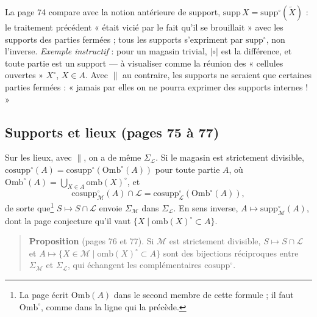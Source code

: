 \documentclass[11pt,a4paper]{article}
\begin{document}
La page 74 compare avec la notion antérieure de support, $\mathrm{supp}\,X =
\mathrm{supp}^{\circ}(\widetilde{X})$ : le traitement précédent « était vicié
par le fait qu'il se brouillait » avec les supports des parties fermées ; tous
les supports s'expriment par $\mathrm{supp}^{\circ}$, non l'inverse.
\emph{Exemple instructif} : pour un magasin trivial, $\mathrel{|\circ|}$ est la
différence, et toute partie est un support --- à visualiser comme la réunion
des « cellules ouvertes » $X^{\circ}$, $X \in A$. Avec $\parallel$ au contraire,
les supports ne seraient que certaines parties fermées : « jamais par elles on
ne pourra exprimer des supports internes ! »

\subsection*{Supports et lieux (pages 75 à 77)}

Sur les lieux, avec $\parallel$, on a de même $\Sigma_{\mathcal{L}}$. Si le
magasin est strictement divisible, $\mathrm{cosupp}^{\circ}(A) =
\mathrm{cosupp}^{\circ}(\mathrm{Omb}^{\circ}(A))$ pour toute partie $A$, où
$\mathrm{Omb}^{\circ}(A) = \bigcup_{X \in A} \mathrm{omb}(X)^{\circ}$, et
\[
\mathrm{cosupp}^{\circ}_{\mathcal{M}}(A) \cap \mathcal{L} =
\mathrm{cosupp}^{\circ}_{\mathcal{L}}(\mathrm{Omb}^{\circ}(A)),
\]
de sorte que\footnote{La page écrit $\mathrm{Omb}(A)$ dans le second membre de
cette formule ; il faut $\mathrm{Omb}^{\circ}$, comme dans la ligne qui la
précède.} $S \mapsto S \cap \mathcal{L}$ envoie $\Sigma_{\mathcal{M}}$ dans
$\Sigma_{\mathcal{L}}$. En sens inverse, $A \mapsto
\mathrm{supp}^{\circ}_{\mathcal{M}}(A)$, dont la page conjecture qu'il vaut
$\{X \mid \mathrm{omb}(X)^{\circ} \subset A\}$.

\begin{quote}
\textbf{Proposition} (pages 76 et 77). Si $\mathcal{M}$ est strictement
divisible, $S \mapsto S \cap \mathcal{L}$ et $A \mapsto \{X \in \mathcal{M}
\mid \mathrm{omb}(X)^{\circ} \subset A\}$ sont des bijections réciproques entre
$\Sigma_{\mathcal{M}}$ et $\Sigma_{\mathcal{L}}$, qui échangent les
complémentaires $\mathrm{cosupp}^{\circ}$.
\end{quote}
\end{document}
